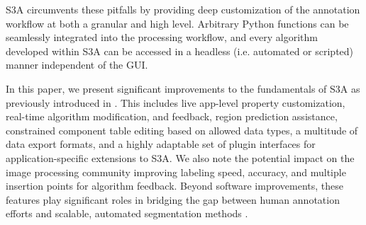 
S3A circumvents these pitfalls by providing deep customization of the annotation workflow at both a granular and high level.
Arbitrary Python functions can be seamlessly integrated into the processing workflow, and every algorithm developed within S3A can be accessed in a headless (i.e. automated or scripted) manner independent of the GUI.

In this paper, we present significant improvements to the fundamentals of S3A as previously introduced in \cite{jessurunComponentDetectionEvaluation2020}.
This includes live app-level property customization, real-time algorithm modification, and feedback, region prediction assistance, constrained component table editing based on allowed data types, a multitude of data export formats, and a highly adaptable set of plugin interfaces for application-specific extensions to S3A.
We also note the potential impact on the image processing community improving labeling speed, accuracy, and multiple insertion points for algorithm feedback.
Beyond software improvements, these features play significant roles in bridging the gap between human annotation efforts and scalable, automated segmentation methods \cite{Branson_humansInLoop}.